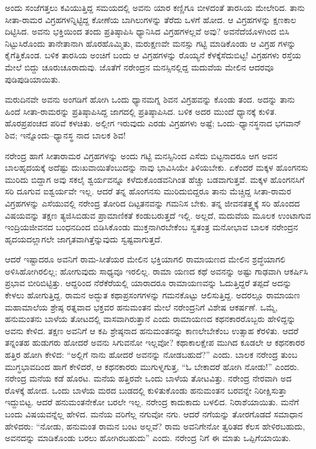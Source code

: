 ಅಂದು ಸಂಜೆಗತ್ತಲು ಕವಿಯುತ್ತಿದ್ದ ಸಮಯದಲ್ಲಿ ಅವನು ಯಾರ ಕಣ್ಣಿಗೂ ಬೀಳದಂತೆ ತಾರಸಿಯ ಮೇಲೇರಿದ. ತಾನು ಸೀತಾ-ರಾಮರ ವಿಗ್ರಹಗಳನ್ನಿಟ್ಟಿದ್ದ ಕೋಣೆಯ ಬಾಗಿಲುಗಳನ್ನು ತೆರೆದು ಒಳಗೆ ಹೋದ. ಆ ವಿಗ್ರಹಗಳನ್ನು ಕ್ಷಣಕಾಲ ದಿಟ್ಟಿಸಿದ. ಅವನು ಭಕ್ತಿಯಿಂದ ತಂದು ಪ್ರತಿಷ್ಠಾಪಿಸಿ ಧ್ಯಾನಿಸಿದ ವಿಗ್ರಹಗಳಲ್ಲವೆ ಅವು? ಅವನೆದೆಯೊಳಗಿಂದ ಬಿಸಿ ನಿಟ್ಟುಸಿರೊಂದು ತಾನೇತಾನಾಗಿ ಹೊರಹೊಮ್ಮಿತು, ಮರುಕ್ಷಣವೇ ಮನಸ್ಸು ಗಟ್ಟಿ ಮಾಡಿಕೊಂಡು ಆ ವಿಗ್ರಹ ಗಳನ್ನು ಕೈಗೆತ್ತಿಕೊಂಡ. ಬಳಿಕ ತಾರಸಿಯ ಅಂಚಿಗೆ ಬಂದು ಆ ವಿಗ್ರಹಗಳನ್ನು ರೊಯ್ಯನೆ ಕೆಳಕ್ಕೆಸೆದುಬಿಟ್ಟ! ವಿಗ್ರಹಗಳು ರಸ್ತೆಯ ಮೇಲೆ ಬಿದ್ದು ಚೂರುಚೂರಾದುವು. ಜೊತೆಗೆ ನರೇಂದ್ರನ ಮನಸ್ಸಿನಲ್ಲಿದ್ದ ಮದುವೆಯ ಮೇಲಿನ ಆದರವೂ ಪುಡಿಪುಡಿಯಾಯಿತು.

ಮರುದಿನವೇ ಅವನು ಅಂಗಡಿಗೆ ಹೋಗಿ ಒಂದು ಧ್ಯಾನಮಗ್ನ ಶಿವನ ವಿಗ್ರಹವನ್ನು ಕೊಂಡು ತಂದ. ಅದನ್ನು ತಾನು ಹಿಂದೆ ಸೀತಾ-ರಾಮರನ್ನು ಪ್ರತಿಷ್ಠಾಪಿಸಿದ್ದ ಜಾಗದಲ್ಲಿ ಪ್ರತಿಷ್ಠಾಪಿಸಿದ. ಬಳಿಕ ಅದರ ಮುಂದೆ ಧ್ಯಾನಕ್ಕೆ ಕುಳಿತ. ಹೊರಪ್ರಪಂಚದ ಪರಿವೆ ಕಳಚಿತು. ಅಲ್ಲೀಗ ಇರುವುದು ಎರಡು ವಿಗ್ರಹಗಳು ಅಷ್ಟೆ; ಒಂದು–ಧ್ಯಾನಸ್ಥನಾದ ಭಗವಾನ್ ಶಿವ; ಇನ್ನೊಂದು–ಧ್ಯಾನಸ್ಥ ನಾದ ಬಾಲಕ ಶಿವ!

ನರೇಂದ್ರ ಹಾಗೆ ಸೀತಾರಾಮರ ವಿಗ್ರಹಗಳನ್ನು ಅಂದು ಗಟ್ಟಿ ಮನಸ್ಸಿನಿಂದ ಎಸೆದು ಬಿಟ್ಟನಾದರೂ ಆಗ ಅವನ ಬಾಲಹೃದಯಕ್ಕೆ ಅದೆಷ್ಟು ದುಃಖವಾಯಿತೆಂಬುದನ್ನು ನಾವು ಭಾವಿಸಿಯೇ ತಿಳಿಯಬೇಕು. ಏಕೆಂದರೆ ಮಕ್ಕಳ ಹೊಂಗನಸು ಮುರಿದು ಬಿದ್ದಾಗ ಅವು ಸಕಲೈ ಶ್ವರ್ಯವನ್ನೂ ಕಳೆದುಕೊಂಡವನಿಗಿಂತ ಹೆಚ್ಚು ಬಡವಾಗುತ್ತವೆ. ಮಕ್ಕಳ ಹೊಂಗನಸಿಗೆ ಸರಿ ದೂಗುವ ಐಶ್ವರ್ಯವೇ ಇಲ್ಲ. ಆದರೆ ತನ್ನ ಹೊಂಗನಸು ಮುರಿದುಬಿದ್ದರೂ ತಾನು ಮೆಚ್ಚಿದ್ದ ಸೀತಾ-ರಾಮರ ವಿಗ್ರಹಗಳನ್ನು ಎಸೆಯುವಲ್ಲಿ ನರೇಂದ್ರ ತೋರಿದ ದಿಟ್ಟತನವನ್ನು ಗಮನಿಸ ಬೇಕು. ತನ್ನ ಜೀವನತತ್ತ್ವಕ್ಕೆ ಸರಿ ಹೊಂದದ ವಿಷಯವನ್ನು ತಕ್ಷಣ ತ್ಯಜಿಸಿಬಿಡುವ ಪ್ರಾಮಾಣಿಕತೆ ಕಂಡುಬರುತ್ತದೆ ಇಲ್ಲಿ. ಅಲ್ಲದೆ, ಮದುವೆಯ ಮೂಲಕ ಉಂಟಾಗುವ ಇಂದ್ರಿಯಜೀವನದ ಬಂಧನದಿಂದ ಬಿಡಿಸಿಕೊಂಡು ಮುಕ್ತನಾಗಿರಬೇಕೆಂಬ ಸ್ವತಂತ್ರ ಮನೋಭಾವ ಬಾಲಕ ನರೇಂದ್ರನ ಹೃದಯದಲ್ಲಾಗಲೇ ಜಾಗೃತವಾಗಿತ್ತೆನ್ನುವುದು ಸ್ವಷ್ಟವಾಗುತ್ತದೆ.

ಆದರೆ ಇಷ್ಟಾದರೂ ಅವನಿಗೆ ರಾಮ-ಸೀತೆಯರ ಮೇಲಿನ ಭಕ್ತಿಯಾಗಲಿ ರಾಮಾಯಣದ ಮೇಲಿನ ಶ್ರದ್ಧೆಯಾಗಲಿ ಅಳಿಸಿಹೋಗಿರಲಿಲ್ಲ; ಹೋಗುವುದು ಸಾಧ್ಯವೂ ಇರಲಿಲ್ಲ. ರಾಮಾ ಯಣದ ಕಥೆ ಅವನನ್ನು ಅಷ್ಟು ಗಾಢವಾಗಿ ಆಕರ್ಷಿಸಿ ಪ್ರಭಾವ ಬೀರಿಬಿಟ್ಟಿತ್ತು. ಆದ್ದರಿಂದ ನೆರೆಕೆರೆಯಲ್ಲಿ ಯಾರಾದರೂ ರಾಮಾಯಣವನ್ನು ಓದುತ್ತಿದ್ದರೆ ತಪ್ಪದೆ ಅದನ್ನು ಕೇಳಲು ಹೋಗುತ್ತಿದ್ದ. ರಾಮನ ಅದ್ಭುತ ಕಥಾಪ್ರಸಂಗಗಳನ್ನು ಗಮನಕೊಟ್ಟು ಆಲಿಸುತ್ತಿದ್ದ. ಅದರಲ್ಲೂ ರಾಮಾಯಣ ಮಹಾಮಾಲೆಯ ಶ್ರೇಷ್ಠ ರತ್ನವಾದ ಭಕ್ತವರ ಹನುಮಂತನ ಮೇಲೆ ನರೇಂದ್ರನಿಗೆ ವಿಶೇಷ ಆಕರ್ಷಣೆ. ಒಮ್ಮೆ, ಹನುಮಂತನು ಬಾಳೆಯ ತೋಟದಲ್ಲಿ ವಾಸವಾಗಿರುತ್ತಾನೆ ಎಂದು ರಾಮಾಯಣದ ಕಥನಕಾರರೊಬ್ಬರು ಹೇಳಿದ್ದನ್ನು ಅವನು ಕೇಳಿದ. ತಕ್ಷಣ ಅವನಿಗೆ ಆ ಕಪಿ ಶ್ರೇಷ್ಠನಾದ ಹನುಮಂತನನ್ನು ಕಾಣಲೇಬೇಕೆಂಬ ಉತ್ಸಾಹ ಕೆರಳಿತು. ಆದರೆ ತನ್ನಂತಹ ಹುಡುಗರು ಹೋದರೆ ಅವನು ಸಿಗುವನೋ ಇಲ್ಲವೋ? ಕಥಾಕಾಲಕ್ಷೇಪ ಮುಗಿದ ಕೂಡಲೇ ಆ ಕಥನಕಾರರ ಹತ್ತಿರ ಹೋಗಿ ಕೇಳಿದ: “ಅಲ್ಲಿಗೆ ನಾನು ಹೋದರೆ ಅವನನ್ನು ನೋಡಬಹುದೆ?” ಎಂದು. ಬಾಲಕ ನರೇಂದ್ರ ತುಂಬ ಮುಗ್ಧಭಾವದಿಂದ ಹಾಗೆ ಕೇಳಿದರೆ, ಆ ಕಥನಕಾರರು ಮುಗುಳ್ನಗುತ್ತ, “ಓ ಬೇಕಾದರೆ ಹೋಗಿ ನೋಡು!” ಎಂದರು. ನರೇಂದ್ರ ಮನೆಯ ಕಡೆ ಹೊರಟ. ಮನೆಯ ಹತ್ತಿರವೇ ಒಂದು ಬಾಳೆಯ ತೋಟವಿತ್ತು. ನರೇಂದ್ರ ನೇರವಾಗಿ ಅದ ರೊಳಕ್ಕೆ ಹೋದ. ಒಂದು ಬಾಳೆಯ ಮರದ ಬುಡದಲ್ಲಿ ಕುಳಿತುಕೊಂಡು ಹನುಮಂತನ ಬರವನ್ನೇ ನಿರೀಕ್ಷಿಸುತ್ತಾ ಇದ್ದುಬಿಟ್ಟ. ಆದರೆ ಹನುಮಂತನೇಕೋ ಬರಲೇ ಇಲ್ಲ. ನರೇಂದ್ರ ಕಾದುಕಾದು ಬಳಲಿದ. ನಿರಾಶೆಯಾಯಿತು. ಮನೆಗೆ ಬಂದು ವಿಷಯವನ್ನೆಲ್ಲ ಹೇಳಿದ. ಮನೆಯ ವರಿಗೆಲ್ಲ ನಗುವೋ ನಗು. ಆದರೆ ನಗೆಯನ್ನು ತೋರಗೊಡದೆ ಸಮಾಧಾನ ಹೇಳಿದರು: “ನೋಡು, ಹನುಮಂತ ರಾಮನ ಬಂಟ ಅಲ್ಲವೆ? ರಾಮ ಅವನಿಗೇನೋ ತ್ವರಿತದ ಕೆಲಸ ಹೇಳಿರಬಹುದು, ಅವನದನ್ನು ಮಾಡಿಕೊಂಡು ಬರಲು ಹೋಗಿರಬಹುದು” ಎಂದು. ನರೇಂದ್ರ ನಿಗೆ ಈ ಮಾತು ಒಪ್ಪಿಗೆಯಾಯಿತು.

